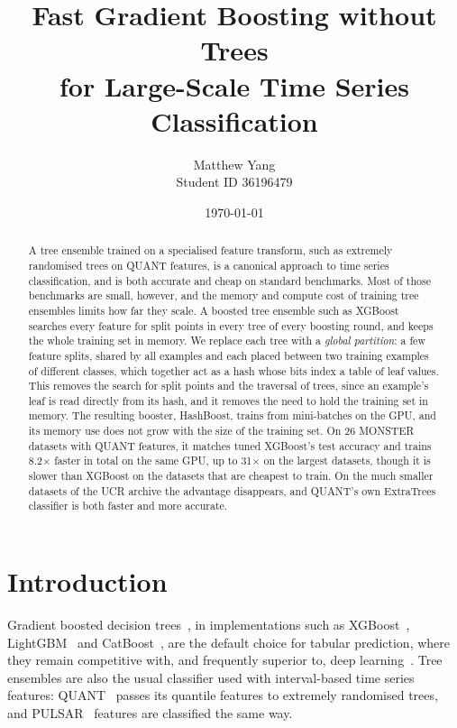 \documentclass[a4paper, 11pt]{article}
\author{Matthew Yang\\
    \small Student ID 36196479}
\title{Fast Gradient Boosting without Trees\\for Large-Scale Time Series Classification}
\date{\today}
\begin{document}
\maketitle

\begin{abstract}
    A tree ensemble trained on a specialised feature transform, such as
    extremely randomised trees on QUANT features, is a canonical approach to
    time series classification, and is both accurate and cheap on standard
    benchmarks. Most of those benchmarks are small, however, and the memory and
    compute cost of training tree ensembles limits how far they scale. A
    boosted tree ensemble such as XGBoost searches every feature for split
    points in every tree of every boosting round, and keeps the whole training
    set in memory. We replace each tree with a \emph{global partition}: a few
    feature splits, shared by all examples and each placed between two training
    examples of different classes, which together act as a hash whose bits
    index a table of leaf values. This removes the search for split points and
    the traversal of trees, since an example's leaf is read directly from its
    hash, and it removes the need to hold the training set in memory. The
    resulting booster, HashBoost, trains from mini-batches on the GPU, and its
    memory use does not grow with the size of the training set. On 26 MONSTER
    datasets with QUANT features, it matches tuned XGBoost's test accuracy and
    trains 8.2$\times$ faster in total on the same GPU, up to 31$\times$ on the
    largest datasets, though it is slower than XGBoost on the datasets that are
    cheapest to train. On the much smaller datasets of the UCR archive the
    advantage disappears, and QUANT's own ExtraTrees classifier is both faster
    and more accurate.
\end{abstract}


\section{Introduction}

Gradient boosted decision trees~\cite{friedman2001greedy}, in implementations
such as XGBoost~\cite{chen2016xgboost}, LightGBM~\cite{ke2017lightgbm} and
CatBoost~\cite{prokhorenkova2018catboost}, are the default choice for tabular
prediction, where they remain competitive with, and frequently superior to,
deep learning~\cite{shwartzziv2022tabular,grinsztajn2022why}. Tree ensembles
are also the usual classifier used with interval-based time series features:
QUANT~\cite{dempster2024quant} passes its quantile features to extremely
randomised trees, and PULSAR~\cite{pulsar} features are classified the
same way.
\end{document}
